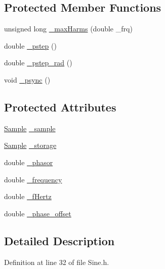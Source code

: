 \subsection*{Protected Member Functions}
\begin{DoxyCompactItemize}
\item 
unsigned long \hyperlink{classSignal_1_1FourierGenerator_abfa6ecda1b94d8ae433e0722e4ec092b}{\+\_\+max\+Harms} (double \+\_\+frq)
\item 
double \hyperlink{classSignal_1_1FourierGenerator_aed4334ef6ec8a47f4fb88a430b65c77b}{\+\_\+pstep} ()
\item 
double \hyperlink{classSignal_1_1FourierGenerator_a01cf1034b4d969b2193205ff94c9a303}{\+\_\+pstep\+\_\+rad} ()
\item 
void \hyperlink{classSignal_1_1FourierGenerator_aea155ae04f7b08050894672bab9d6c52}{\+\_\+psync} ()
\end{DoxyCompactItemize}
\subsection*{Protected Attributes}
\begin{DoxyCompactItemize}
\item 
\hyperlink{classSignal_1_1Sample}{Sample} \hyperlink{classSignal_1_1FourierGenerator_a78c37a66bf33a2fda3c9e92478ad418c}{\+\_\+sample}
\item 
\hyperlink{classSignal_1_1Sample}{Sample} \hyperlink{classSignal_1_1FourierGenerator_af7ad42ccb202fba6c0fb1ec653c5cb36}{\+\_\+storage}
\item 
double \hyperlink{classSignal_1_1FourierGenerator_a72d24f45a30cd143508ce7eb753f4436}{\+\_\+phasor}
\item 
double \hyperlink{classSignal_1_1SignalGenerator_a7f107461333bce68c5dad412db96a8c2}{\+\_\+frequency}
\item 
double \hyperlink{classSignal_1_1SignalGenerator_a85a4702347352bab1c71e0a8df8437d6}{\+\_\+f\+Hertz}
\item 
double \hyperlink{classSignal_1_1SignalGenerator_a6b4444d46747c8517171edbbf4b5588f}{\+\_\+phase\+\_\+offset}
\end{DoxyCompactItemize}


\subsection{Detailed Description}


Definition at line 32 of file Sine.\+h.



